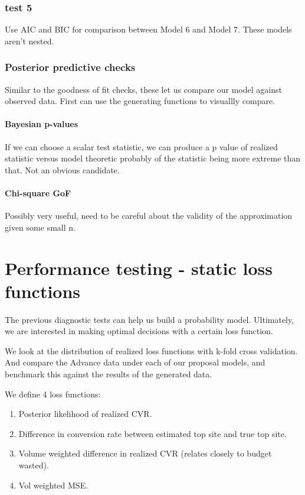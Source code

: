 \documentclass[11pt,a4,singlespacing,titlepagenumber=on]{scrreprt}
\numberwithin{equation}{chapter} %
\theoremstyle{remark}
\begin{document}
\subsection{test 5}

Use AIC and BIC for comparison between Model 6 and Model 7. These models aren't nested.

\subsection{Posterior predictive checks}

Similar to the goodness of fit checks, these let us compare our model against observed data. First can use the generating functions to visuallly compare.

\subsubsection{Bayesian p-values}

If we can choose a scalar test statistic, we can produce a p value of realized statistic versus model theoretic probably of the statistic being more extreme than that. Not an obvious candidate.

\subsubsection{Chi-square GoF}

Possibly very useful, need to be careful about the validity of the approximation given some small n.

\chapter{ Performance testing - static loss functions }

The previous diagnostic tests can help us build a probability model. Ultimately, we are interested in making optimal decisions with a certain loss function. 

We look at the distribution of realized loss functions with k-fold cross validation. And compare the Advance data under each of our proposal models, and benchmark this against the results of the generated data.

We define 4 loss functions:
\begin{enumerate}
	\item Posterior likelihood of realized CVR. 
	\item Difference in conversion rate between estimated top site and true top site.
	\item Volume weighted difference in realized CVR (relates closely to budget wasted). 
	\item Vol weighted MSE.
\end{enumerate}
\end{document}

